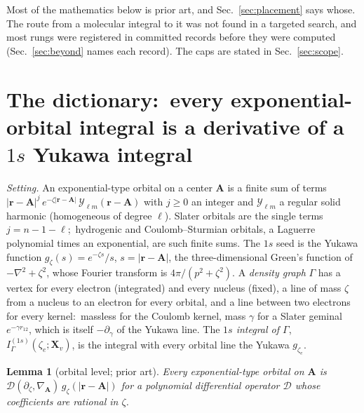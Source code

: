 \documentclass[aps,pra,twocolumn,superscriptaddress,longbibliography]{revtex4-2}
\newtheorem{lemma}{Lemma}
\begin{document}
Most of the mathematics below is prior art, and Sec.~\ref{sec:placement}
says whose.  The route from a molecular integral to it was not found in a
targeted search, and most rungs were registered in committed records before
they were computed (Sec.~\ref{sec:beyond} names each record).  The caps are
stated in Sec.~\ref{sec:scope}.

\section{The dictionary:\ every exponential-orbital integral is a derivative of a $1s$ Yukawa integral}
\label{sec:dictionary}

\emph{Setting.}  An exponential-type orbital on a center $\bm A$ is a finite
sum of terms $|\bm r-\bm A|^{j}\,e^{-\zeta|\bm r-\bm A|}\,\mathcal{Y}_{\ell m}(\bm r-\bm A)$
with $j\ge0$ an integer and $\mathcal{Y}_{\ell m}$ a regular solid harmonic
(homogeneous of degree $\ell$).  Slater orbitals are the single terms
$j=n-1-\ell$;\ hydrogenic and Coulomb--Sturmian orbitals, a Laguerre
polynomial times an exponential, are such finite sums.  The $1s$ seed is the
Yukawa function $g_\zeta(s)=e^{-\zeta s}/s$, $s=|\bm r-\bm A|$, the
three-dimensional Green's function of $-\nabla^2+\zeta^2$, whose Fourier
transform is $4\pi/(p^2+\zeta^2)$.  A \emph{density graph} $\Gamma$ has a
vertex for every electron (integrated) and every nucleus (fixed), a line of
mass $\zeta$ from a nucleus to an electron for every orbital, and a line
between two electrons for every kernel:\ massless for the Coulomb kernel,
mass $\gamma$ for a Slater geminal $e^{-\gamma r_{12}}$, which is itself
$-\partial_\gamma$ of the Yukawa line.  The \emph{$1s$ integral of $\Gamma$},
$I^{(1s)}_\Gamma(\zeta_e;\bm X_v)$, is the integral with every orbital line
the Yukawa $g_{\zeta_e}$.

\begin{lemma}[orbital level; prior art]
\label{lem:orbital}
Every exponential-type orbital on $\bm A$ is
$\mathcal{D}(\partial_\zeta,\nabla_{\!\bm A})\,g_\zeta(|\bm r-\bm A|)$ for a
polynomial differential operator $\mathcal{D}$ whose coefficients are
rational in $\zeta$.
\end{lemma}
\end{document}
